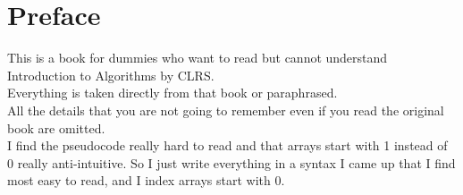 \chapter{Preface}
This is a book for dummies who want to read but cannot understand Introduction to Algorithms by CLRS.\\
Everything is taken directly from that book or paraphrased.\\
All the details that you are not going to remember even if you read the original book are omitted. \\
I find the pseudocode really hard to read and that arrays start with 1 instead of 0 really anti-intuitive. So 
I just write everything in a syntax I came up that I find most easy to read, and I index arrays start with 0.
